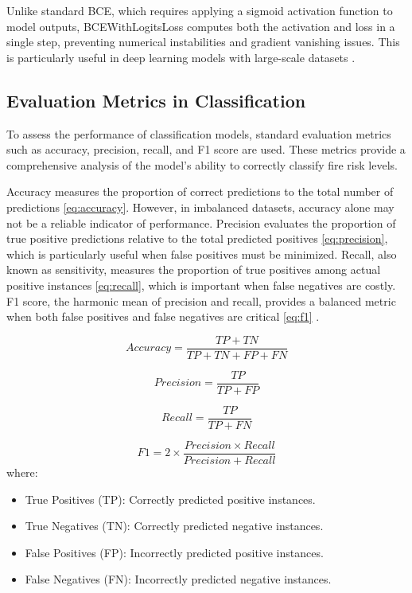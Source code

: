 Unlike standard BCE, which requires applying a sigmoid activation function to model outputs, 
BCEWithLogitsLoss computes both the activation and loss in a single step, preventing numerical 
instabilities and gradient vanishing issues. This is particularly useful in deep learning 
models with large-scale datasets \cite{ruder2016overview}.

\subsection{Evaluation Metrics in Classification}

To assess the performance of classification models, standard evaluation metrics 
such as accuracy, precision, recall, and F1 score are used. These metrics provide a 
comprehensive analysis of the model's ability to correctly classify fire risk levels.

Accuracy measures the proportion of correct predictions to the total number of predictions 
\eqref{eq:accuracy}. However, in imbalanced datasets, accuracy alone may not be a reliable 
indicator of performance. Precision evaluates the proportion of true positive predictions 
relative to the total predicted positives \eqref{eq:precision}, which is particularly 
useful when false positives must be minimized. Recall, also known as sensitivity, 
measures the proportion of true positives among actual positive instances \eqref{eq:recall}, 
which is important when false negatives are costly. F1 score, the harmonic mean 
of precision and recall, provides a balanced metric when both false positives and false 
negatives are critical \eqref{eq:f1} \cite{vidalwadi2024}.

\begin{equation}
    Accuracy = \frac{TP + TN}{TP + TN + FP + FN}
    \label{eq:accuracy}
\end{equation}

\begin{equation}
    Precision = \frac{TP}{TP + FP}
    \label{eq:precision}
\end{equation}

\begin{equation}
    Recall = \frac{TP}{TP + FN}
    \label{eq:recall}
\end{equation}

\begin{equation}
    F1 = 2 \times \frac{Precision \times Recall}{Precision + Recall}
    \label{eq:f1}
\end{equation}
where:
\begin{itemize}
    \item True Positives (TP): Correctly predicted positive instances.
    \item True Negatives (TN): Correctly predicted negative instances.
    \item False Positives (FP): Incorrectly predicted positive instances.
    \item False Negatives (FN): Incorrectly predicted negative instances.
\end{itemize}

